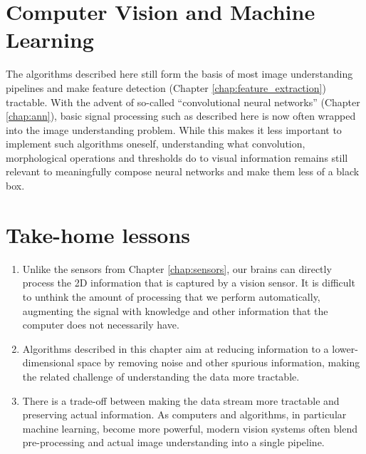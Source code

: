 \section{Computer Vision and Machine Learning}
The algorithms described here still form the basis of most image understanding pipelines and make feature detection (Chapter \ref{chap:feature_extraction}) tractable. With the advent of so-called ``convolutional neural networks'' (Chapter \ref{chap:ann}), basic signal processing such as described here is now often wrapped into the image understanding problem. While this makes it less important to implement such algorithms oneself, understanding what convolution, morphological operations and thresholds do to visual information remains still relevant to meaningfully compose neural networks and make them less of a black box. 


\section*{Take-home lessons}
\begin{enumerate}
\item Unlike the sensors from Chapter \ref{chap:sensors}, our brains can directly process the 2D information that is captured by a vision sensor. It is difficult to unthink the amount of processing that we perform automatically, augmenting the signal with knowledge and other information that the computer does not necessarily have.
\item  Algorithms described in this chapter aim at reducing information to a lower-dimensional space by removing noise and other spurious information, making the related challenge of understanding the data more tractable. 
\item There is a trade-off between making the data stream more tractable and preserving actual information. As computers and algorithms, in particular machine learning, become more powerful, modern vision systems often blend pre-processing and actual image understanding into a single pipeline. 
\end{enumerate}


